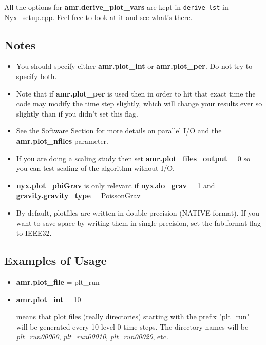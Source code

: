 All the options for {\bf amr.derive\_plot\_vars} are kept in \texttt{derive\_lst} in Nyx\_setup.cpp.  Feel free to look at it and see what's there. 


\subsection{Notes}

\begin{itemize}

\item You should specify either {\bf amr.plot\_int} or {\bf amr.plot\_per}.  Do not try to specify both. 

\item Note that if {\bf amr.plot\_per} is used then in order to hit that exact time the 
code may modify the time step slightly, which will change your results ever so slightly 
than if you didn't set this flag.

\item See the Software Section for more details on parallel I/O and the 
{\bf amr.plot\_nfiles} parameter.

\item If you are doing a scaling study then set {\bf amr.plot\_files\_output} = 0
so you can test scaling of the algorithm without I/O.

\item {\bf nyx.plot\_phiGrav} is only relevant if 
{\bf nyx.do\_grav} = 1 and {\bf gravity.gravity\_type} = PoissonGrav

\item By default, plotfiles are written in double precision (NATIVE format).  If you want to 
save space by writing them in single precision, set the fab.format flag to IEEE32.

\end{itemize}

\subsection{Examples of Usage}

\begin{itemize}

\item {\bf amr.plot\_file} = plt\_run
\item {\bf amr.plot\_int} = 10

means that plot files (really directories) starting with the prefix "plt\_run" will be
generated every 10 level 0 time steps.  The directory names will be {\it plt\_run00000}, 
{\it plt\_run00010}, {\it plt\_run00020}, etc.

\end{itemize}

